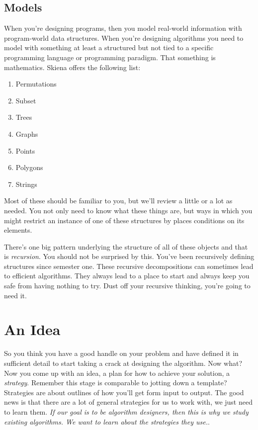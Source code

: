 \documentclass[]{tufte-handout}
\begin{document}
\subsection{Models}

When you're designing programs, then you model real-world information with program-world data structures.  When you're designing algorithms you need to model with something at least a structured but not tied to a specific programming language or programming paradigm. That something is mathematics. Skiena offers the following list:
\begin{enumerate}
\item Permutations
\item Subset
\item Trees
\item Graphs
\item Points
\item Polygons
\item Strings 
\end{enumerate}
Most of these should be familiar to you, but we'll review a little or a lot as needed. You not only need to know what these things are, but ways in which you might restrict an instance of one of these structures by places conditions on its elements. 

There's one big pattern underlying the structure of all of these objects and that is \textit{recursion}.  You should not be surprised by this.  You've been recursively defining structures since semester one.  These recursive decompositions can sometimes lead to efficient algorithms.  They always lead to a place to start and always keep you safe from having nothing to try.  Dust off your recursive thinking, you're going to need it.

\section{An Idea}

So you think you have a good handle on your problem and have defined it in sufficient detail to start taking a crack at designing the algorithm.  Now what? Now you come up with an idea, a plan for how to achieve your solution, a \textit{strategy}.  Remember this stage is comparable to jotting down a template? Strategies are about outlines of how you'll get form input to output.  The good news is that there are a lot of general strategies for us to work with, we just need to learn them. \textit{If our goal is to be algorithm designers, then this is why we study existing algorithms. We want to learn about the strategies they use.}.
\end{document}
